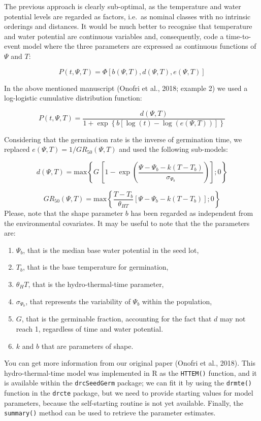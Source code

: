 \documentclass[
]{book}
\providecommand{\tightlist}{%
  \setlength{\itemsep}{0pt}\setlength{\parskip}{0pt}}
\begin{document}
The previous approach is clearly sub-optimal, as the temperature and water potential levels are regarded as factors, i.e.~as nominal classes with no intrinsic orderings and distances. It would be much better to recognise that temperature and water potential are continuous variables and, consequently, code a time-to-event model where the three parameters are expressed as continuous functions of \(\Psi\) and \(T\):

\[P(t, \Psi, T) = \Phi \left[ b(\Psi, T), d(\Psi, T), e(\Psi, T) \right]\]

In the above mentioned manuscript (Onofri et al., 2018; example 2) we used a log-logistic cumulative distribution function:

\[P(t, \Psi, T) = \frac{ d(\Psi, T) }{1 + \exp \left\{ b \left[ \log(t) - \log( e(\Psi, T) ) \right] \right\} }\]

Considering that the germination rate is the inverse of germination time, we replaced \(e(\Psi, T) = 1/GR_{50}(\Psi, T)\) and used the following sub-models:

\[d(\Psi, T) = \textrm{max} \left\{ G \, \left[ 1 - \exp \left( \frac{ \Psi - \Psi_b - k(T - T_b )}{\sigma_{\Psi_b}} \right) \right]; 0 \right\}\]

\[GR_{50}(\Psi, T) = \textrm{max} \left\{ \frac{T - T_b }{\theta_{HT}} \left[\Psi - \Psi_b - k(T - T_b )\right]; 0 \right\}\]
Please, note that the shape parameter \(b\) has been regarded as independent from the environmental covariates. It may be useful to note that the the parameters are:

\begin{enumerate}
\def\labelenumi{\arabic{enumi}.}
\tightlist
\item
  \(\Psi_{b}\), that is the median base water potential in the seed lot,
\item
  \(T_{b}\), that is the base temperature for germination,
\item
  \(\theta_HT\), that is the hydro-thermal-time parameter,
\item
  \(\sigma_{\Psi_b}\), that represents the variability of \(\Psi_b\) within the population,
\item
  \(G\), that is the germinable fraction, accounting for the fact that \(d\) may not reach 1, regardless of time and water potential.
\item
  \(k\) and \(b\) that are parameters of shape.
\end{enumerate}

You can get more information from our original paper (Onofri et al., 2018). This hydro-thermal-time model was implemented in R as the \texttt{HTTEM()} function, and it is available within the \texttt{drcSeedGerm} package; we can fit it by using the \texttt{drmte()} function in the \texttt{drcte} package, but we need to provide starting values for model parameters, because the self-starting routine is not yet available. Finally, the \texttt{summary()} method can be used to retrieve the parameter estimates.
\end{document}
